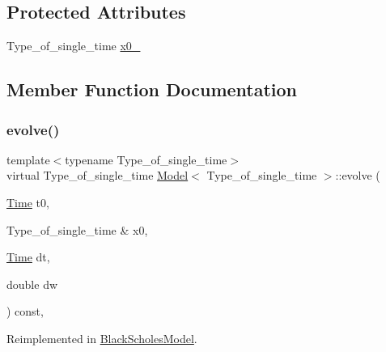 \subsection*{Protected Attributes}
\begin{DoxyCompactItemize}
\item 
Type\+\_\+of\+\_\+single\+\_\+time \hyperlink{class_model_a8b547d019a51a21f539209227fbde146}{x0\+\_\+}
\end{DoxyCompactItemize}


\subsection{Member Function Documentation}
\hypertarget{class_model_a18b1fe1476b5adde8d6125e7f6a7f932}{}\label{class_model_a18b1fe1476b5adde8d6125e7f6a7f932} 
\subsubsection{\texorpdfstring{evolve()}{evolve()}\hspace{0.1cm}{\footnotesize\ttfamily [1/2]}}
{\footnotesize\ttfamily template$<$typename Type\+\_\+of\+\_\+single\+\_\+time$>$ \\
virtual Type\+\_\+of\+\_\+single\+\_\+time \hyperlink{class_model}{Model}$<$ Type\+\_\+of\+\_\+single\+\_\+time $>$\+::evolve (\begin{DoxyParamCaption}\item[{\hyperlink{_name_def_8h_ac2d3e0ba793497bcca555c7c2cf64ff3}{Time}}]{t0,  }\item[{Type\+\_\+of\+\_\+single\+\_\+time \&}]{x0,  }\item[{\hyperlink{_name_def_8h_ac2d3e0ba793497bcca555c7c2cf64ff3}{Time}}]{dt,  }\item[{double}]{dw }\end{DoxyParamCaption}) const\hspace{0.3cm}{\ttfamily [inline]}, {\ttfamily [virtual]}}



Reimplemented in \hyperlink{class_black_scholes_model_a67c3ed604a6d057112ec7e7a1a3fb301}{Black\+Scholes\+Model}.

\hypertarget{class_model_a2bc277990d41a0abc4e2658f94107481}{}\label{class_model_a2bc277990d41a0abc4e2658f94107481} 
